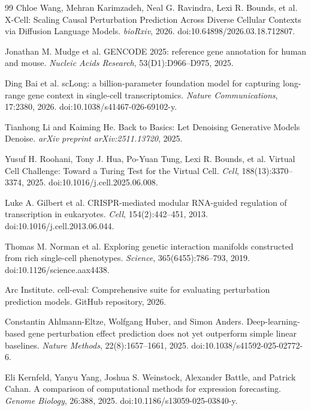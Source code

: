 \documentclass[11pt]{article}
\begin{document}
\begin{thebibliography}{99}
  Chloe Wang, Mehran Karimzadeh, Neal G. Ravindra, Lexi R. Bounds, et al.
  \newblock X-Cell: Scaling Causal Perturbation Prediction Across Diverse Cellular Contexts via Diffusion Language Models.
  \newblock \emph{bioRxiv}, 2026.
  \newblock doi:10.64898/2026.03.18.712807.

  Jonathan M. Mudge et al.
  \newblock GENCODE 2025: reference gene annotation for human and mouse.
  \newblock \emph{Nucleic Acids Research}, 53(D1):D966--D975, 2025.

  Ding Bai et al.
  \newblock scLong: a billion-parameter foundation model for capturing long-range gene context in single-cell transcriptomics.
  \newblock \emph{Nature Communications}, 17:2380, 2026.
  \newblock doi:10.1038/s41467-026-69102-y.

  Tianhong Li and Kaiming He.
  \newblock Back to Basics: Let Denoising Generative Models Denoise.
  \newblock \emph{arXiv preprint arXiv:2511.13720}, 2025.

  Yusuf H. Roohani, Tony J. Hua, Po-Yuan Tung, Lexi R. Bounds, et al.
  \newblock Virtual Cell Challenge: Toward a Turing Test for the Virtual Cell.
  \newblock \emph{Cell}, 188(13):3370--3374, 2025.
  \newblock doi:10.1016/j.cell.2025.06.008.

  Luke A. Gilbert et al.
  \newblock CRISPR-mediated modular RNA-guided regulation of transcription in eukaryotes.
  \newblock \emph{Cell}, 154(2):442--451, 2013.
  \newblock doi:10.1016/j.cell.2013.06.044.

  Thomas M. Norman et al.
  \newblock Exploring genetic interaction manifolds constructed from rich single-cell phenotypes.
  \newblock \emph{Science}, 365(6455):786--793, 2019.
  \newblock doi:10.1126/science.aax4438.

  Arc Institute.
  \newblock cell-eval: Comprehensive suite for evaluating perturbation prediction models.
  \newblock GitHub repository, 2026.

  Constantin Ahlmann-Eltze, Wolfgang Huber, and Simon Anders.
  \newblock Deep-learning-based gene perturbation effect prediction does not yet outperform simple linear baselines.
  \newblock \emph{Nature Methods}, 22(8):1657--1661, 2025.
  \newblock doi:10.1038/s41592-025-02772-6.

  Eli Kernfeld, Yanyu Yang, Joshua S. Weinstock, Alexander Battle, and Patrick Cahan.
  \newblock A comparison of computational methods for expression forecasting.
  \newblock \emph{Genome Biology}, 26:388, 2025.
  \newblock doi:10.1186/s13059-025-03840-y.
\end{thebibliography}
\end{document}
